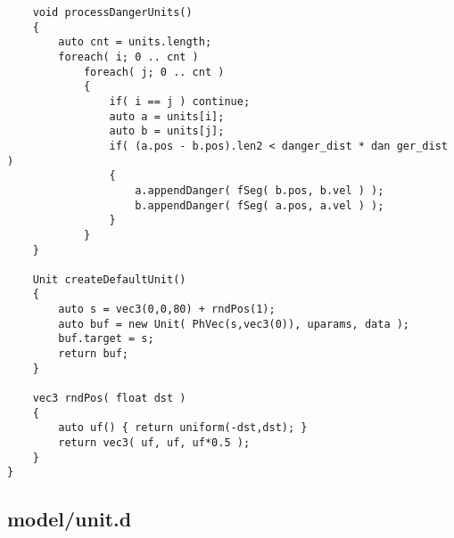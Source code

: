 \begin{verbatim}
    void processDangerUnits()
    {
        auto cnt = units.length;
        foreach( i; 0 .. cnt )
            foreach( j; 0 .. cnt )
            {
                if( i == j ) continue;
                auto a = units[i];
                auto b = units[j];
                if( (a.pos - b.pos).len2 < danger_dist * dan ger_dist )
                {
                    a.appendDanger( fSeg( b.pos, b.vel ) );
                    b.appendDanger( fSeg( a.pos, a.vel ) );
                }
            }
    }

    Unit createDefaultUnit()
    {
        auto s = vec3(0,0,80) + rndPos(1);
        auto buf = new Unit( PhVec(s,vec3(0)), uparams, data );
        buf.target = s;
        return buf;
    }

    vec3 rndPos( float dst )
    {
        auto uf() { return uniform(-dst,dst); }
        return vec3( uf, uf, uf*0.5 );
    }
}
\end{verbatim}

\subsection{model/unit.d}

